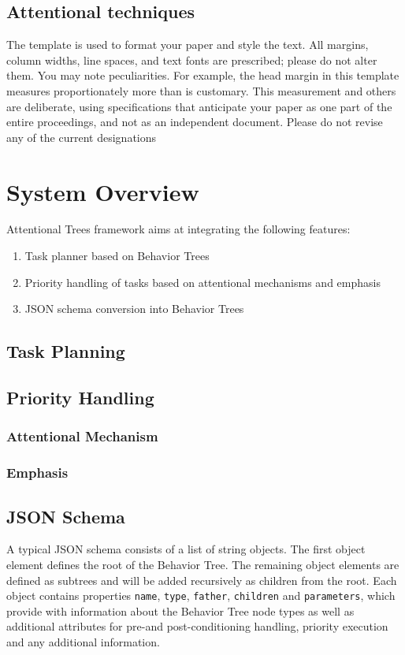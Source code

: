 \documentclass[letterpaper, 10 pt, conference]{ieeeconf}  %
\begin{document}
\subsection{Attentional techniques}

The template is used to format your paper and style the text. All margins, column widths, line spaces, and text fonts are prescribed; please do not alter them. You may note peculiarities. For example, the head margin in this template measures proportionately more than is customary. This measurement and others are deliberate, using specifications that anticipate your paper as one part of the entire proceedings, and not as an independent document. Please do not revise any of the current designations

\section{System Overview}
Attentional Trees framework aims at integrating the following features:
\begin{enumerate}
\item Task planner based on Behavior Trees
\item Priority handling of tasks based on attentional mechanisms and emphasis \cite{b2}
\item JSON schema conversion into Behavior Trees 
\end{enumerate}

\subsection{Task Planning}
\subsection{Priority Handling}
\subsubsection{Attentional Mechanism}
\subsubsection{Emphasis}
\subsection{JSON Schema}
 A typical JSON schema consists of a list of string objects. The first object element defines the root of the Behavior Tree. The remaining object elements are defined as subtrees and will be added recursively as children from the root. Each object contains properties \verb|name|, \verb|type|, \verb|father|, \verb|children| and \verb|parameters|, which provide with information about the Behavior Tree node types as well as additional attributes for pre-and post-conditioning handling, priority execution and any additional information. 
 
\end{document}

